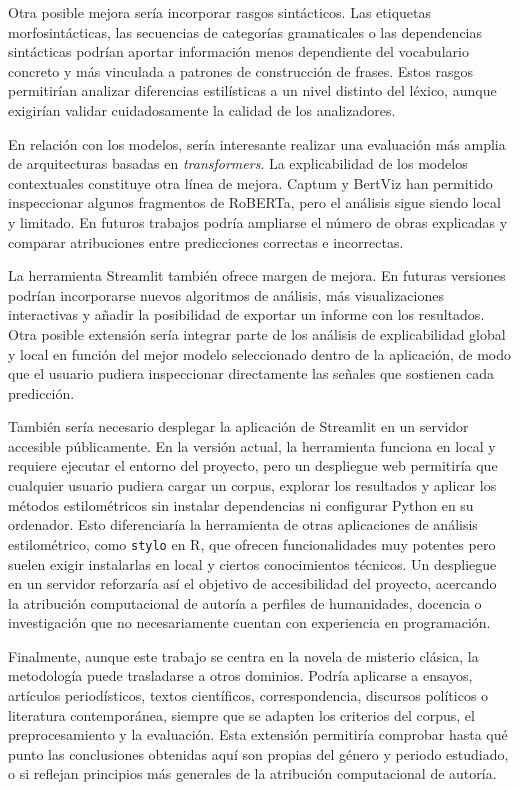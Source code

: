 \documentclass[IB]{TFUOC}%
\begin{document}
Otra posible mejora sería incorporar rasgos sintácticos. Las etiquetas morfosintácticas, las secuencias de categorías gramaticales o las dependencias sintácticas podrían aportar información menos dependiente del vocabulario concreto y más vinculada a patrones de construcción de frases. Estos rasgos permitirían analizar diferencias estilísticas a un nivel distinto del léxico, aunque exigirían validar cuidadosamente la calidad de los analizadores.

En relación con los modelos, sería interesante realizar una evaluación más amplia de arquitecturas basadas en \textit{transformers}. La explicabilidad de los modelos contextuales constituye otra línea de mejora. Captum y BertViz han permitido inspeccionar algunos fragmentos de RoBERTa, pero el análisis sigue siendo local y limitado. En futuros trabajos podría ampliarse el número de obras explicadas y comparar atribuciones entre predicciones correctas e incorrectas.

La herramienta Streamlit también ofrece margen de mejora. En futuras versiones podrían incorporarse nuevos algoritmos de análisis, más visualizaciones interactivas y añadir la posibilidad de exportar un informe con los resultados. Otra posible extensión sería integrar parte de los análisis de explicabilidad global y local en función del mejor modelo seleccionado dentro de la aplicación, de modo que el usuario pudiera inspeccionar directamente las señales que sostienen cada predicción.

También sería necesario desplegar la aplicación de Streamlit en un servidor accesible públicamente. En la versión actual, la herramienta funciona en local y requiere ejecutar el entorno del proyecto, pero un despliegue web permitiría que cualquier usuario pudiera cargar un corpus, explorar los resultados y aplicar los métodos estilométricos sin instalar dependencias ni configurar Python en su ordenador. Esto diferenciaría la herramienta de otras aplicaciones de análisis estilométrico, como \texttt{stylo} en R, que ofrecen funcionalidades muy potentes pero suelen exigir instalarlas en local y ciertos conocimientos técnicos. Un despliegue en un servidor reforzaría así el objetivo de accesibilidad del proyecto, acercando la atribución computacional de autoría a perfiles de humanidades, docencia o investigación que no necesariamente cuentan con experiencia en programación.

Finalmente, aunque este trabajo se centra en la novela de misterio clásica, la metodología puede trasladarse a otros dominios. Podría aplicarse a ensayos, artículos periodísticos, textos científicos, correspondencia, discursos políticos o literatura contemporánea, siempre que se adapten los criterios del corpus, el preprocesamiento y la evaluación. Esta extensión permitiría comprobar hasta qué punto las conclusiones obtenidas aquí son propias del género y periodo estudiado, o si reflejan principios más generales de la atribución computacional de autoría.
\end{document}

